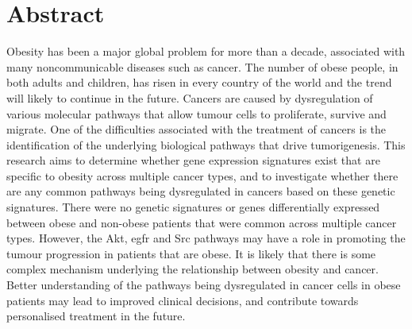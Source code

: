 \vspace*{\fill}

\section*{\centering Abstract}

Obesity has been a major global problem for more than a decade, associated with many noncommunicable diseases such as  cancer.
The number of obese people, in both adults and children, has risen in every country of the world and the trend will likely to continue in the future.
Cancers are caused by dysregulation of various molecular pathways that allow tumour cells to proliferate, survive and migrate.
One of the difficulties associated with the treatment of cancers is the identification of the underlying biological pathways that drive tumorigenesis.
This research aims to determine whether gene expression signatures exist  that are specific to obesity across multiple cancer types, and to investigate whether there are any common pathways being dysregulated in cancers based on these genetic signatures.
There were no genetic signatures or genes differentially expressed between obese and non-obese patients that were common across multiple cancer types.
However, the Akt, \gls{egfr} and Src pathways may have a role in promoting the tumour progression in patients that are obese.
It is likely that there is some complex mechanism underlying the relationship between obesity and cancer.
Better understanding of the pathways being dysregulated in cancer cells in obese patients may lead to improved clinical decisions, and contribute towards personalised treatment in the future.

\vfill

